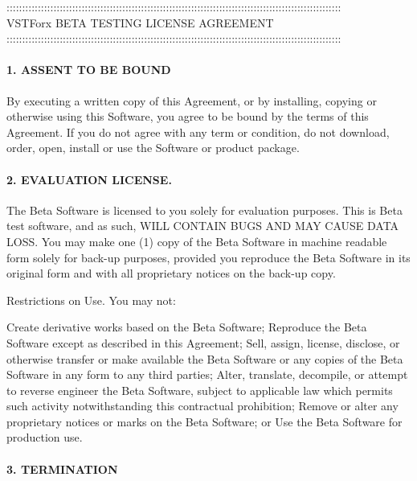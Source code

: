 
\begin{center}
:::::::::::::::::::::::::::::::::::::::::::::::::::::::::::::::::::::::::::::::::::::::::::::::::::::::::::\\
VSTForx BETA TESTING LICENSE AGREEMENT\\
:::::::::::::::::::::::::::::::::::::::::::::::::::::::::::::::::::::::::::::::::::::::::::::::::::::::::::\\
\end{center}
\paragraph{1. ASSENT TO BE BOUND}

By executing a written copy of this Agreement, or by installing, copying or otherwise using this Software, you agree to be bound by the terms of this Agreement. If you do not agree with any term or condition, do not download, order, open, install or use the Software or product package.

\paragraph{2. EVALUATION LICENSE.}

The Beta Software is licensed to you solely for evaluation purposes. This is Beta test software, and as such, WILL CONTAIN BUGS AND MAY CAUSE DATA LOSS. You may make one (1) copy of the Beta Software in machine readable form solely for back-up purposes, provided you reproduce the Beta Software in its original form and with all proprietary notices on the back-up copy.

Restrictions on Use. You may not:

Create derivative works based on the Beta Software;
Reproduce the Beta Software except as described in this Agreement;
Sell, assign, license, disclose, or otherwise transfer or make available the Beta Software or any copies of the Beta Software in any form to any third parties;
Alter, translate, decompile, or attempt to reverse engineer the Beta Software, subject to applicable law which permits such activity notwithstanding this contractual prohibition;
Remove or alter any proprietary notices or marks on the Beta Software; or
Use the Beta Software for production use.

\paragraph{3. TERMINATION}

